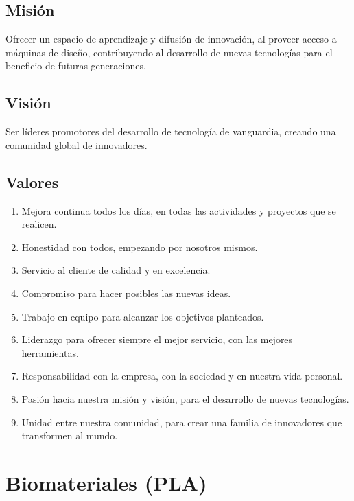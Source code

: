 \documentclass[]{article}
\begin{document}
\subsection{Misión}
 
Ofrecer un espacio de aprendizaje y difusión de innovación, al proveer acceso a máquinas de diseño, contribuyendo al desarrollo de nuevas tecnologías para el beneficio de futuras generaciones.\\


\subsection{Visión}
 
Ser líderes promotores del desarrollo de tecnología de vanguardia, creando una comunidad global de innovadores.\\

\subsection{Valores}

\begin{enumerate}
	\item Mejora continua todos los días, en todas las actividades y proyectos que se realicen.
	\item Honestidad  con todos, empezando por nosotros mismos.
	\item Servicio al cliente de calidad y en excelencia.
	\item Compromiso para hacer posibles las nuevas ideas.
	\item Trabajo en equipo para alcanzar los objetivos planteados.
	\item Liderazgo para ofrecer siempre el mejor servicio, con las mejores herramientas.
	\item Responsabilidad con la empresa, con la sociedad y en nuestra vida personal.
	\item Pasión hacia nuestra misión y visión, para el desarrollo de nuevas tecnologías.
	\item Unidad entre nuestra comunidad, para crear una familia de innovadores que transformen al mundo. 	 
\end{enumerate} 



\section{Biomateriales (PLA)}
\end{document}
